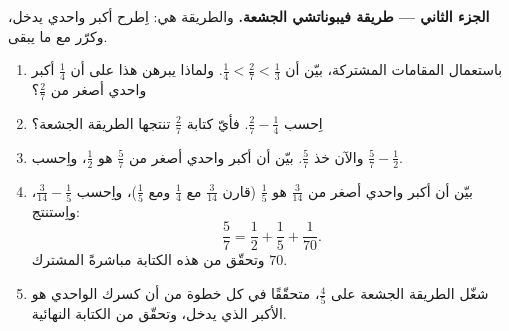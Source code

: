 \begin{problem}
\medskip
\noindent\textbf{الجزء الثاني --- طريقة فيبوناتشي الجشعة.}
والطريقة هي: اِطرح أكبر  واحدي
يدخل، وكرّر مع ما يبقى.
\begin{enumerate}[resume]
  \item باستعمال المقامات المشتركة، بيّن أن
        $\frac14 < \frac27 < \frac13$. ولماذا يبرهن هذا على أن
        $\frac14$ أكبر  واحدي أصغر من
        $\frac27$؟
  \item اِحسب $\frac27 - \frac14$. فأيّ كتابة  $\frac27$
        تنتجها الطريقة الجشعة؟
  \item والآن خذ $\frac57$. بيّن أن أكبر  واحدي
        أصغر من $\frac57$ هو $\frac12$، واِحسب
        $\frac57 - \frac12$.
  \item بيّن أن أكبر  واحدي أصغر من
        $\frac{3}{14}$ هو $\frac15$ (قارن $\frac{3}{14}$ مع
        $\frac14$ ومع $\frac15$)، واِحسب
        $\frac{3}{14} - \frac15$، واِستنتج:
        \[
        \frac57 = \frac12 + \frac15 + \frac{1}{70} .
        \]
        وتحقّق من هذه الكتابة مباشرةً  المشترك
        $70$.
  \item شغّل الطريقة الجشعة على $\frac45$، متحقّقًا في كل خطوة
        من أن كسرك الواحدي هو الأكبر الذي يدخل،
        وتحقّق من الكتابة النهائية.
\end{enumerate}


\end{problem}
